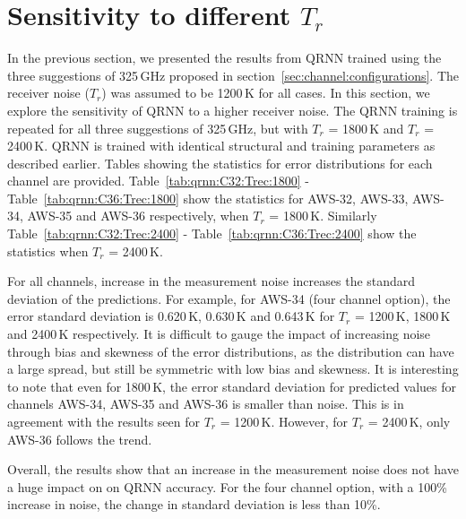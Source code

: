 \documentclass[12pt]{article}
\begin{document}
\section{Sensitivity to different $T_r$}
\label{sec:tr}
%
In the previous section, we presented the results from QRNN trained using the
three suggestions of 325\,GHz proposed in
section~\ref{sec:channel:configurations}. The receiver noise ($T_r$) was
assumed to be 1200\,K for all cases. In this section, we explore the
sensitivity of QRNN to a higher receiver noise. The QRNN training is repeated
for all three suggestions of 325\,GHz, but with $T_r$ = 1800\,K and $T_r$ =
2400\,K. QRNN is trained with identical structural and training parameters as
described earlier. Tables showing the statistics for error distributions for
each channel are provided. Table~\ref{tab:qrnn:C32:Trec:1800} -
Table~\ref{tab:qrnn:C36:Trec:1800} show the statistics for AWS-32, AWS-33,
AWS-34, AWS-35 and AWS-36 respectively, when $T_r$ = 1800\,K. Similarly
Table~\ref{tab:qrnn:C32:Trec:2400} - Table~\ref{tab:qrnn:C36:Trec:2400} show
the statistics when $T_r$ = 2400\,K.

For all channels, increase in the measurement noise increases the standard
deviation of the predictions. For example, for AWS-34 (four channel option),
the error standard deviation is 0.620\,K, 0.630\,K and 0.643\,K for $T_r$ =
1200\,K, 1800\,K and 2400\,K respectively. It is difficult to gauge the impact
of increasing noise through bias and skewness of the error distributions, as
the distribution can have a large spread, but still be symmetric with low bias
and skewness. It is interesting to note that even for 1800\,K, the error
standard deviation for predicted values for channels AWS-34, AWS-35 and AWS-36
is smaller than noise. This is in agreement with the results seen for $T_r$ =
1200\,K. However, for $T_r$ = 2400\,K, only AWS-36 follows the trend.

Overall, the results show that an increase in the measurement noise does not have a huge impact on on QRNN accuracy. For the four channel option, with a 100\% increase in noise, the change in standard deviation is less than 10\%. 
\end{document}
